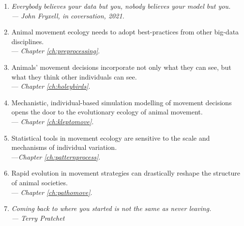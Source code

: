 \begin{onehalfspace}
    \begin{enumerate}
        \item \textit{Everybody believes your data but you, nobody believes your model but you.\\ --- John Fryxell, in coversation, 2021.}

        \item Animal movement ecology needs to adopt best-practices from other big-data disciplines.\\ --- \textit{Chapter \ref{ch:preprocessing}}.

        \item Animals' movement decisions incorporate not only what they can see, but what they think other individuals can see.\\ --- \textit{Chapter \ref{ch:holeybirds}}.

        \item Mechanistic, individual-based simulation modelling of movement decisions opens the door to the evolutionary ecology of animal movement. \\ --- \textit{Chapter \ref{ch:kleptomove}}.

        \item Statistical tools in movement ecology are sensitive to the scale and mechanisms of individual variation.\\ ---\textit{Chapter \ref{ch:patternprocess}}.

        \item Rapid evolution in movement strategies can drastically reshape the structure of animal societies.\\ --- \textit{Chapter \ref{ch:pathomove}}.

        \item \textit{Coming back to where you started is not the same as never leaving.\\--- Terry Pratchet}
    \end{enumerate}

\end{onehalfspace}

\endgroup

\vfill

\clearpage
